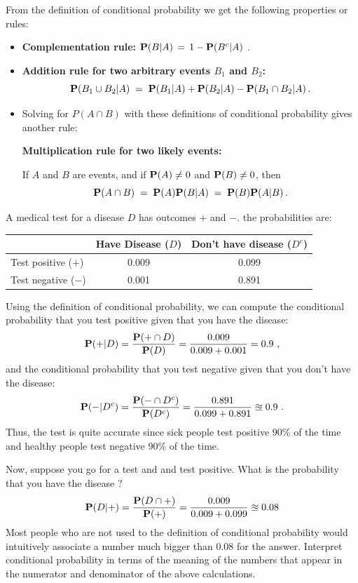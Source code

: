 From the definition of conditional probability we get the following properties or rules:
\begin{itemize}
\item[]{{\bf Complementation rule:} $\mathbf{P}(B | A)\, = \,1 - \mathbf{P}(B^c | A)$ .}
\item[]{{\bf Addition rule for two arbitrary events $B_1$ and $B_2$:} \[{\mathbf{P}(B_1 \cup B_2 | A) \;= \;\mathbf{P}(B_1 | A) + \mathbf{P}(B_2 | A) - \mathbf{P}(B_1\cap B_2|A)}\,.\]}
\item[]{Solving for $P(A\cap B)$ with  these definitions of conditional probability
gives another rule:
\begin{framed}
{\bf Multiplication rule for two likely events:} 

If $A$ and $B$ are events, and if
  $\mathbf{P}(A)\neq 0$ and  $\mathbf{P}(B)\neq 0$, then
\[\mathbf{P}(A\cap B)\;=\;\mathbf{P}(A)\mathbf{P}(B|A)\;=\;\mathbf{P}(B)\mathbf{P}(A|B)\,. \]
\end{framed}
}
\end{itemize}


\begin{example}[Wasserman03, p.~11]\label{EX:Wasserman03p11}
 A medical test for a disease $D$ has outcomes $+$ and $-$.  the probabilities are:
\begin{center}
 \begin{tabular}{l | c | c}
 \hline
 & Have Disease ($D$) & Don't have disease ($D^c$)  \\ \hline
Test positive ($+$) & 0.009 & 0.099 \\
 Test negative ($-$) & 0.001 & 0.891\\ \hline
 \end{tabular}
 \end{center}
 Using the definition of conditional probability, we can compute the conditional probability that you test positive given that you have the disease:
 \[
 \mathbf{P}(+ | D) = \frac{\mathbf{P}(+ \cap D)}{\mathbf{P}(D)} = \frac{0.009}{0.009+0.001}=0.9 \ ,
 \]
 and the conditional probability that you test negative given that you don't have the disease:
 \[
 \mathbf{P}(- | D^c) = \frac{\mathbf{P}(- \cap D^c)}{\mathbf{P}(D^c)} = \frac{0.891}{0.099+0.891} \approxeq 0.9 \ .
 \]
 Thus, the test is quite accurate since sick people test positive 90\% of the time and healthy people test negative 90\% of the time.
 
Now, suppose you go for a test and and test positive.  What is the probability that you have the disease ?
 \[
 \mathbf{P}(D|+) = \frac{\mathbf{P}(D \cap +)}{\mathbf{P}(+)} = \frac{0.009}{0.009+0.099} \approxeq 0.08
 \]
Most people who are not used to the definition of conditional probability would intuitively associate a number much bigger than $0.08$ for the answer.  Interpret conditional probability in terms of the meaning of the numbers that appear in the numerator and denominator of the above calculations.
\end{example}
 
